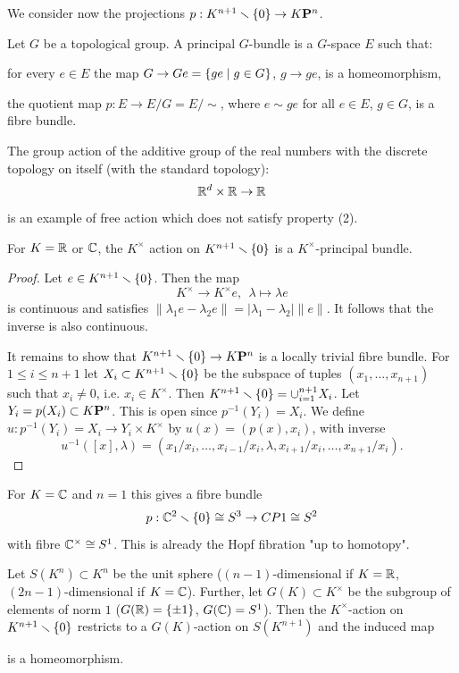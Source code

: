 We consider now the projections $p:K^{n+1}\smallsetminus\{0\}\to{K\mathbf{P}^n}$.

Let $G$ be a topological group. A principal $G$-bundle is a $G$-space $E$ such that:
\begin{numerate}
    \item for every $e\in E$ the map $G\to Ge=\{ge\mid g\in G\}$, $g\to ge$, is a homeomorphism,
    \item the quotient map $p:E\to E/G=E/\sim$, where $e\sim ge$ for all $e\in E$, $g\in G$, is a fibre bundle.
\end{numerate}

\begin{example}
The group action of the additive group of the real numbers with the discrete topology on itself (with the standard topology):
\[{\mathbb R}^d\times{\mathbb R}\to{\mathbb R}\]
is an example of free action which does not satisfy property (2).
\end{example}

\begin{proposition}
 For $K={\mathbb R}$ or $\mathbb{C}$, the $K^\times$ action on $K^{n+1}\smallsetminus\{0\}$ is a $K^\times$-principal bundle.
\end{proposition}

\begin{proof}
Let $e\in K^{n+1}\smallsetminus\{0\}$. Then the map
\[K^\times\to K^\times e,\ \ \lambda\mapsto\lambda e\]
is continuous and satisfies $\|\lambda_1 e-\lambda_2 e\|=|\lambda_1-\lambda_2|\|e\|$. It follows that the inverse is also continuous.

It remains to show that $K^{n+1}\smallsetminus\{0\}\to {K\mathbf{P}^n}$ is a locally trivial fibre bundle. For $1\leq i\leq n+1$ let $X_i\subset K^{n+1}\smallsetminus\{0\}$ be the subspace of tuples $(x_1,\dots,x_{n+1})$ such that $x_i\neq 0$, i.e. $x_i\in K^\times$. Then $K^{n+1}\smallsetminus\{0\}=\cup_{i=1}^{n+1}X_i$. Let $Y_i=p(X_i)\subset {K\mathbf{P}^n}$. This is open since $p^{-1}(Y_i)=X_i$. We define $u:p^{-1}(Y_i)=X_i\to Y_i\times K^\times$ by $u(x)=(p(x),x_i)$, with inverse
\[u^{-1}([x],\lambda)=(x_1/x_i,\dots,x_{i-1}/x_i,\lambda,x_{i+1}/x_i,\dots,x_{n+1}/x_i).\]
\end{proof}

For $K=\mathbb{C}$ and $n=1$ this gives a fibre bundle
\[p:\mathbb{C}^2\smallsetminus\{0\}\cong S^3\to CP1\cong S^2\]
with fibre $\mathbb{C}^\times\cong S^1$. This is already the Hopf fibration "up to homotopy".

Let $S(K^n)\subset K^n$ be the unit sphere ($(n-1)$-dimensional if $K={\mathbb R}$, $(2n-1)$-dimensional if $K=\mathbb{C}$). Further, let $G(K)\subset K^\times$ be the subgroup of elements of norm $1$ ($G({\mathbb R})=\{\pm1\}$, $G(\mathbb{C})=S^1$). Then the $K^\times$-action on $K^{n+1}\smallsetminus\{0\}$ restricts to a $G(K)$-action on $S(K^{n+1})$ and the induced map
\begin{center}
\end{center}
is a homeomorphism.

